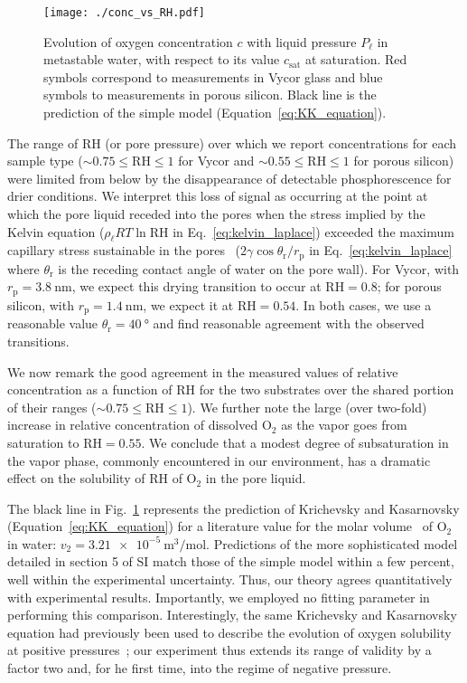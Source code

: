 \documentclass[aps,prl,twocolumn,superscriptaddress,groupedaddress]{revtex4}
\begin{document}
\begin{figure}[!htb]
\centering
\texttt{[image: ./conc\_vs\_RH.pdf]}
\caption{Evolution of oxygen concentration $c$ with liquid pressure $P_\ell$ in metastable water, with respect to its value $c_\text{sat}$ at saturation. Red symbols correspond to measurements in Vycor glass and blue symbols to measurements in porous silicon. Black line is the prediction of the simple model (Equation~\eqref{eq:KK_equation}). \label{fig:conc_vs_RH}}
\end{figure}

The range of $\mathrm{RH}$ (or pore pressure) over which we report concentrations for each sample type ($\sim 0.75 \leq \mathrm{RH} \leq 1$ for Vycor and $\sim 0.55 \leq \mathrm{RH} \leq 1$ for porous silicon) were limited from below by the disappearance of detectable phosphorescence for drier conditions. We interpret this loss of signal as occurring at the point at which the pore liquid receded into the pores when the stress implied by the Kelvin equation ($\rho_\ell R T \ln{\mathrm{RH}}$ in Eq.~\eqref{eq:kelvin_laplace}) exceeded the maximum capillary stress sustainable in the pores~\cite{rasmussen_2010} ($2\gamma \cos{\theta_\text{r}} / r_\text{p}$ in Eq.~\eqref{eq:kelvin_laplace} where $\theta_\text{r}$ is the receding contact angle of water on the pore wall). For Vycor, with $r_\text{p}=\SI{3.8}{\nano\meter}$, we expect this drying transition to occur at $\mathrm{RH}=0.8$; for porous silicon, with $r_\text{p}=\SI{1.4}{\nano\meter}$, we expect it at $\mathrm{RH}=0.54$. In both cases, we use a reasonable value $\theta_\text{r}=\SI{40}{\degree}$ and find reasonable agreement with the observed transitions.

We now remark the good agreement in the measured values of relative concentration as a function of $\mathrm{RH}$  for the two substrates over the shared portion of their ranges ($\sim 0.75 \leq \mathrm{RH} \leq 1$). We further note the large (over two-fold) increase in relative concentration of dissolved $\mathrm{O_2}$ as the vapor goes from saturation to $\mathrm{RH} = 0.55$. We conclude that a modest degree of subsaturation in the vapor phase, commonly encountered in our environment, has a dramatic effect on the solubility of $\mathrm{RH}$ of $\mathrm{O_2}$ in the pore liquid.

The black line in Fig.~\ref{fig:conc_vs_RH} represents the prediction of Krichevsky and Kasarnovsky (Equation~\eqref{eq:KK_equation}) for a literature value for the molar volume~\cite{taylor_1978,zhou_2001} of $\mathrm{O_2}$ in water: $v_2=\SI{3.21e-5}{\meter\cubed\per\mole}$. Predictions of the more sophisticated model detailed in section 5 of SI match those of the simple model within a few percent, well within the experimental uncertainty. Thus, our theory agrees quantitatively with experimental results. Importantly, we employed no fitting parameter in performing this comparison. Interestingly, the same Krichevsky and Kasarnovsky equation had previously been used to describe the evolution of oxygen solubility at positive pressures~\cite{taylor_1978}; our experiment thus extends its range of validity by a factor two and, for he first time, into the regime of negative pressure. 
\end{document}
